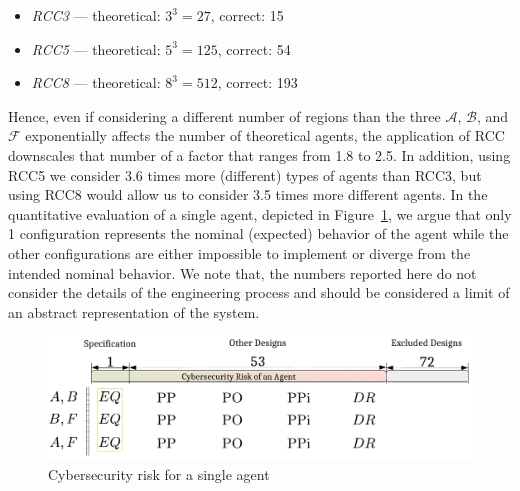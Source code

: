 \documentclass[conference]{IEEEtran}
\newcommand{\assertionRegion}{\mathcal{A}}
\newcommand{\beliefRegion}{\mathcal{B}}
\newcommand{\factRegion}{\mathcal{F}}
\begin{document}
\begin{itemize}%
\item \emph{RCC3} --- theoretical: $3^3=27$,  correct: 15 
\item \emph{RCC5} --- theoretical: $5^3=125$, correct: 54
\item \emph{RCC8} --- theoretical: $8^3=512$, correct: 193
\end{itemize}

Hence, even if considering a different number of regions than the three
$\assertionRegion$, $\beliefRegion$, and $\factRegion$ exponentially affects
the number of theoretical agents, the application of RCC downscales that number
of a factor that ranges from 1.8 to 2.5. In addition, using RCC5 we consider
3.6 times more (different) types of agents than RCC3, but using RCC8 would
allow us to consider 3.5 times more different agents.
In the quantitative evaluation of a single agent, depicted in Figure~\ref{fig:quantitative},
we argue that only 1 configuration represents the nominal (expected) behavior 
of the agent while the other configurations are either impossible to 
implement or diverge from the intended nominal behavior. We note 
that, the numbers reported here do not consider the details of the
engineering process and should be considered a limit of an abstract 
representation of the system.
\begin{figure}[t]
	\centering
	\includegraphics[width=\columnwidth]{quantitative.pdf}
	\caption{Cybersecurity risk for a single agent}
	\label{fig:quantitative}
\end{figure}
\end{document}
